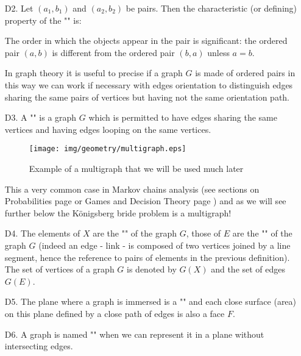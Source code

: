 {\begin{enumerate}
	\item[D2.] Let $(a_1, b_1)$ and $(a_2, b_2)$ be pairs. Then the characteristic (or defining) property of the "" is:
		
		 The order in which the objects appear in the pair is significant: the ordered pair $(a, b)$ is different from the ordered pair $(b, a)$ unless $a = b$. 
		 
		In graph theory it is useful to precise if a graph $G$ is made of ordered pairs in this way we can work if necessary with edges orientation to distinguish edges sharing the same pairs of vertices but having not the same orientation path.
	
	\item[D3.] A "" is a graph $G$ which is permitted to have edges sharing the same vertices and having edges looping on the same vertices.
	
	\begin{figure}[H]
	\centering
	\texttt{[image: img/geometry/multigraph.eps]}
	\caption{Example of a multigraph that we will be used much later}
	\end{figure}
	
	\begin{tcolorbox}[title=Remark,colframe=black,arc=10pt]
This a very common case in Markov chains analysis (see sections on Probabilities page \pageref{markov chains} or Games and Decision Theory page \pageref{markov decision process}) and as we will see further below the Königsberg bride problem is a multigraph!
	\end{tcolorbox}	 

	\item[D4.] The elements of $X$ are the "" of the graph $G$, those of $E$ are the "" of the graph $G$ (indeed an edge - link - is composed of two vertices joined by a line segment, hence the reference to pairs of elements in the previous definition). The set of vertices of a graph $G$ is denoted by $G (X)$ and the set of edges $G (E)$.
	
	\item[D5.] The plane where a graph is immersed is a "" and each close surface (area) on this plane defined by a close path of edges is also a face $F$. 

	\item[D6.] A graph is named "" when we can represent it in a plane without intersecting edges.
	

\end{enumerate}}
